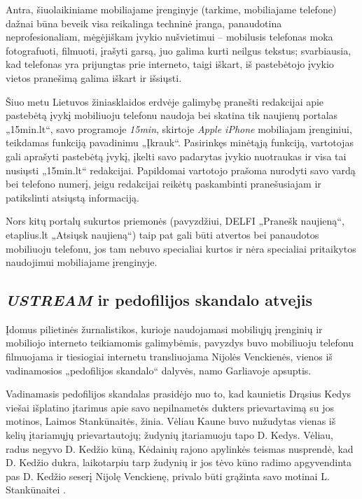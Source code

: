 \documentclass[kursinis-darbas]{vukf}
\begin{document}
Antra, šiuolaikiniame mobiliajame įrenginyje (tarkime, mobiliajame telefone) dažnai būna beveik visa reikalinga techninė įranga, panaudotina neprofesionaliam, mėgėjiškam įvykio nušvietimui – mobilusis telefonas moka fotografuoti, filmuoti, įrašyti garsą, juo galima kurti neilgus tekstus; svarbiausia, kad telefonas yra prijungtas prie interneto, taigi iškart, iš pastebėtojo įvykio vietos pranešimą galima iškart ir išsiųsti.

Šiuo metu Lietuvos žiniasklaidos erdvėje galimybę pranešti redakcijai apie pastebėtą įvykį mobiliuoju telefonu naudoja bei skatina tik naujienų portalas „15min.lt“, savo programoje \emph{15min}, skirtoje \emph{Apple iPhone} mobiliajam įrenginiui, teikdamas funkciją pavadinimu „Įkrauk“. Pasirinkęs minėtąją funkciją, vartotojas gali aprašyti pastebėtą įvykį, įkelti savo padarytas įvykio nuotraukas ir visa tai nusiųsti „15min.lt“ redakcijai. Papildomai vartotojo prašoma nurodyti savo vardą bei telefono numerį, jeigu redakcijai reikėtų paskambinti pranešusiajam ir patikslinti atsiųstą informaciją.

Nors kitų portalų sukurtos priemonės (pavyzdžiui, DELFI „Pranešk naujieną“, etaplius.lt „Atsiųsk naujieną“) taip pat gali būti atvertos bei panaudotos mobiliuoju telefonu, jos tam nebuvo specialiai kurtos ir nėra specialiai pritaikytos naudojimui mobiliajame įrenginyje.


\subsection{\emph{USTREAM} ir pedofilijos skandalo atvejis}

Įdomus pilietinės žurnalistikos, kurioje naudojamasi mobiliųjų įrenginių ir mobiliojo interneto teikiamomis galimybėmis, pavyzdys buvo mobiliuoju telefonu filmuojama ir tiesiogiai internetu transliuojama Nijolės Venckienės, vienos iš vadinamosios „pedofilijos skandalo“ dalyvės, namo Garliavoje apsuptis.

Vadinamasis pedofilijos skandalas prasidėjo nuo to, kad kaunietis Drąsius Kedys viešai išplatino įtarimus apie savo nepilnametės dukters prievartavimą su jos motinos, Laimos Stankūnaitės, žinia. Vėliau Kaune buvo nužudytas vienas iš kelių įtariamųjų prievartautojų; žudynių įtariamuoju tapo D. Kedys. Vėliau, radus negyvo D. Kedžio kūną, Kėdainių rajono apylinkės teismas nusprendė, kad D. Kedžio dukra, laikotarpiu tarp žudynių ir jos tėvo kūno radimo apgyvendinta pas D. Kedžio seserį Nijolę Venckienę, privalo būti grąžinta savo motinai L. Stankūnaitei \cite{delfi_teismas_kedzio_dukrele_grazino_motinai}.
\end{document}
